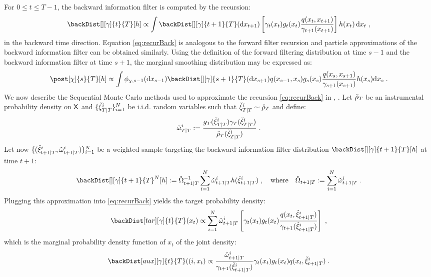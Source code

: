 For $0\le t \le T-1$, the backward information filter is computed by the recursion:
\begin{equation}
\label{eq:recurBack}
\backDist[][\gamma]{t}{T}[h]\propto \int \backDist[][\gamma]{t+1}{T}(\rmd x_{t+1})\left[\gamma_t(x_t) g_t(x_t) \frac{q(x_t,x_{t+1})}{\gamma_{t+1}(x_{t+1})} \right] h(x_t) \, \rmd x_t \eqsp, 
\end{equation}
in the backward time direction. Equation \eqref{eq:recurBack} is analogous to the forward filter recursion and particle approximations of the backward information filter can be obtained similarly.
Using the definition of the forward filtering distribution at time $s - 1$ and the backward information filter at time $s + 1$, the marginal smoothing distribution may be expressed as:
\begin{equation}
\label{eq:filtBackfilt}
\post[\Xinit]{s}{T}[h]  \propto \int \filt{\Xinit,s-1}(\rmd x_{s-1}) \backDist[][\gamma]{s+1}{T}(\rmd x_{s+1})q(x_{s-1},x_s) g_s(x_s) \frac{q(x_s,x_{s+1})}{\gamma_{s+1}(x_{s+1})} h(x_s) \rmd x_s \eqsp.
\end{equation}
 We now describe the Sequential Monte Carlo methods used to approximate the recursion \eqref{eq:recurBack} in \cite{briers:doucet:maskell:2010}, \cite{fearnhead:wyncoll:tawn:2010}.
Let ${\check{\rho}}_T$ be an instrumental probability density on $\mathsf{X}$ and $\{{\check{\xi}}_{T|T}^{i}\}_{i=1}^N$ be i.i.d. random variables such that ${\check{\xi}}_{T|T}^{i}\sim{\check{\rho}}_T$ and define:
\[
{\check{\omega}}_{T|T}^{i} := \frac{g_T({\check{\xi}}_{T|T}^{i})\gamma_T({\check{\xi}}_{T|T}^{i})}{{\check{\rho}}_T({\check{\xi}}_{T|T}^{i})}\;.
\]
Let now $\{ ({\check{\xi}}_{t+1|T}^{i},{\check{\omega}}_{t+1|T}^{i}) \}_{i=1}^N$ be a weighted sample targeting the backward information filter distribution $\backDist[][\gamma]{t+1}{T}[h]$  at time $t+1$:
\[
\backDist[][\gamma]{t+1}{T}^N[h] \eqdef \backsumwght{t+1}{T}^{-1} \sum_{i=1}^N \ebackwght{t+1}{T}{i}h(\ebackpart{t+1}{T}{i})\eqsp,\quad\mbox{where}\quad\backsumwght{t+1}{T} \eqdef \sum_{i=1}^N \ebackwght{t+1}{T}{i}\eqsp.
\]
Plugging this approximation into \eqref{eq:recurBack} yields the target probability density:
\begin{equation*}
\backDist[tar][\gamma]{t}{T}(x_t)\propto \sum_{i=1}^N \ebackwght{t+1}{T}{i} \left[\gamma_t(x_t) g_t(x_t) \frac{q(x_t,\ebackpart{t+1}{T}{i})}{\gamma_{t+1}(\ebackpart{t+1}{T}{i})} \right] \eqsp,
\end{equation*}
which is the marginal probability density function of  $x_t$ of the joint  density:
\begin{equation*}
\backDist[aux][\gamma]{t}{T} ((i, x_t) \propto \frac{\ebackwght{t+1}{T}{i}}{\gamma_{t+1}(\ebackpart{t+1}{T}{i})} \gamma_t(x_t) g_t(x_t) q(x_t, \ebackpart{t+1}{T}{i}) \eqsp.
\end{equation*}
